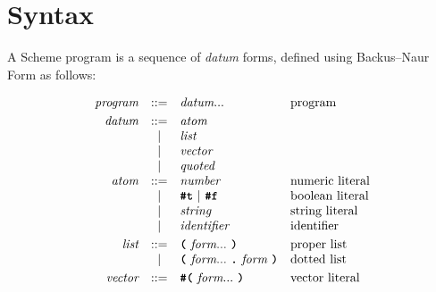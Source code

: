 \section{Syntax}

A Scheme program is a sequence of \emph{datum} forms, defined using
Backus--Naur Form as follows:

\renewcommand{\arraystretch}{1.2}

\[\begin{array}{rcll}

\textit{program}        & ::= & \textit{datum} ...                                                   & \text{program} \\[1mm]

\textit{datum}          & ::= & \textit{atom}                                                       & \\
                        & |   & \textit{list}                                                       & \\
                        & |   & \textit{vector}                                                     & \\
                        & |   & \textit{quoted}                                                     & \\

\textit{atom}           & ::= & \textit{number}                                                     & \text{numeric literal} \\
                        & |   & \term{\#t} \ | \ \term{\#f}                                      & \text{boolean literal} \\
                        & |   & \textit{string}                                                     & \text{string literal} \\
                        & |   & \textit{identifier}                                                 & \text{identifier} \\[1mm]

\textit{list}           & ::= & \term{(} \ \textit{form}... \ \term{)}                           & \text{proper list} \\
                        & |   & \term{(} \ \textit{form}... \ \term{.} \ \textit{form} \ \term{)}
                                                                                                        & \text{dotted list} \\[1mm]

\textit{vector}         & ::= & \term{\#(} \ \textit{form}... \ \term{)}                          & \text{vector literal} \\[1mm]


\end{array}\]
